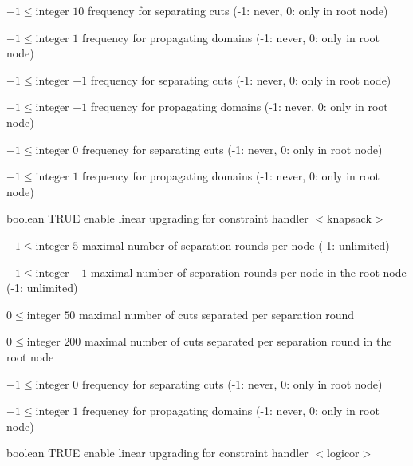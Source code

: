 %
{$-1\leq\textrm{integer}$}%
{$10$}%
{frequency for separating cuts (-1: never, 0: only in root node)}%
{}

%
{$-1\leq\textrm{integer}$}%
{$1$}%
{frequency for propagating domains (-1: never, 0: only in root node)}%
{}

%
{$-1\leq\textrm{integer}$}%
{$-1$}%
{frequency for separating cuts (-1: never, 0: only in root node)}%
{}

%
{$-1\leq\textrm{integer}$}%
{$-1$}%
{frequency for propagating domains (-1: never, 0: only in root node)}%
{}

%
{$-1\leq\textrm{integer}$}%
{$0$}%
{frequency for separating cuts (-1: never, 0: only in root node)}%
{}

%
{$-1\leq\textrm{integer}$}%
{$1$}%
{frequency for propagating domains (-1: never, 0: only in root node)}%
{}

%
{boolean}%
{TRUE}%
{enable linear upgrading for constraint handler $<$knapsack$>$}%
{}

%
{$-1\leq\textrm{integer}$}%
{$5$}%
{maximal number of separation rounds per node (-1: unlimited)}%
{}

%
{$-1\leq\textrm{integer}$}%
{$-1$}%
{maximal number of separation rounds per node in the root node (-1: unlimited)}%
{}

%
{$0\leq\textrm{integer}$}%
{$50$}%
{maximal number of cuts separated per separation round}%
{}

%
{$0\leq\textrm{integer}$}%
{$200$}%
{maximal number of cuts separated per separation round in the root node}%
{}

%
{$-1\leq\textrm{integer}$}%
{$0$}%
{frequency for separating cuts (-1: never, 0: only in root node)}%
{}

%
{$-1\leq\textrm{integer}$}%
{$1$}%
{frequency for propagating domains (-1: never, 0: only in root node)}%
{}

%
{boolean}%
{TRUE}%
{enable linear upgrading for constraint handler $<$logicor$>$}%
{}

